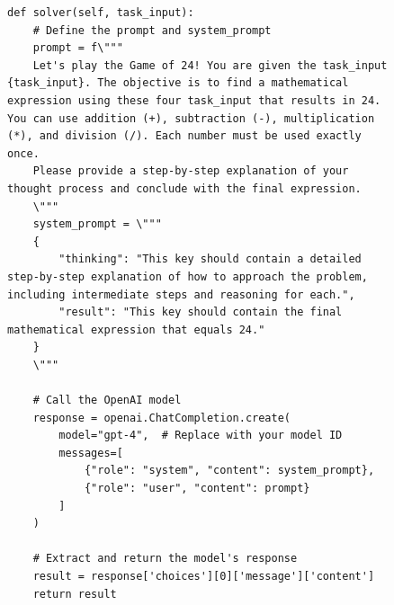 \begin{figure}[ht]
\begin{lstlisting}[style=pythonstyle, caption={Initial code based on Chain-of-Thought for Game of 24.}]
def solver(self, task_input):
    # Define the prompt and system_prompt
    prompt = f\"""
    Let's play the Game of 24! You are given the task_input {task_input}. The objective is to find a mathematical expression using these four task_input that results in 24. You can use addition (+), subtraction (-), multiplication (*), and division (/). Each number must be used exactly once. 
    Please provide a step-by-step explanation of your thought process and conclude with the final expression.
    \"""
    system_prompt = \"""
    {
        "thinking": "This key should contain a detailed step-by-step explanation of how to approach the problem, including intermediate steps and reasoning for each.",
        "result": "This key should contain the final mathematical expression that equals 24."
    }
    \"""

    # Call the OpenAI model
    response = openai.ChatCompletion.create(
        model="gpt-4",  # Replace with your model ID
        messages=[
            {"role": "system", "content": system_prompt},
            {"role": "user", "content": prompt}
        ]
    )

    # Extract and return the model's response
    result = response['choices'][0]['message']['content']
    return result
\end{lstlisting}
\end{figure}
